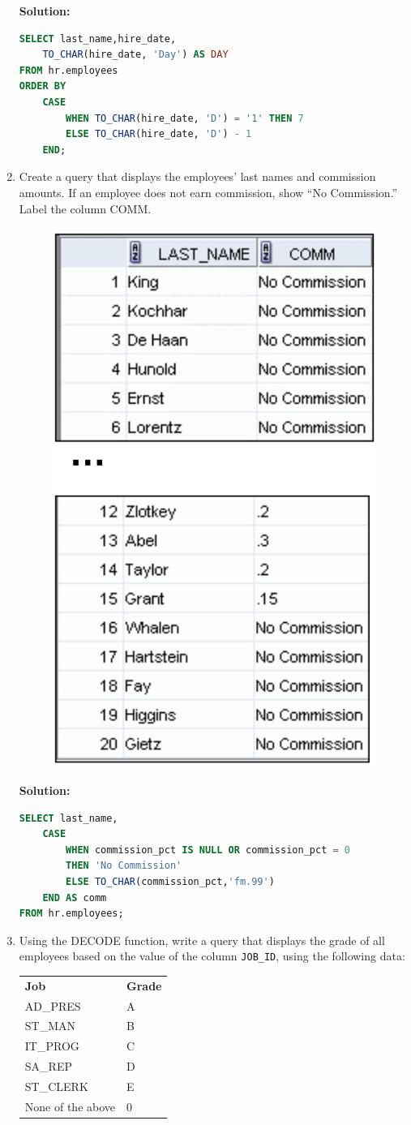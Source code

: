 \documentclass[a4paper,12pt]{article}
\begin{document}
\begin{enumerate}
    \textbf{Solution: }
    \begin{lstlisting}[language=SQL]
SELECT last_name,hire_date,
    TO_CHAR(hire_date, 'Day') AS DAY
FROM hr.employees
ORDER BY
    CASE
        WHEN TO_CHAR(hire_date, 'D') = '1' THEN 7
        ELSE TO_CHAR(hire_date, 'D') - 1
    END;
    \end{lstlisting}
        \item Create a query that displays the employees' last names and commission amounts. If an employee
does not earn commission, show “No Commission.” Label the column COMM.
    \begin{figure}[h]
        \centering
            \centering
            \includegraphics[width=.35\linewidth]{graphics/44.png}
    \end{figure}
    \newpage
    \textbf{Solution: }
    \begin{lstlisting}[language=SQL]
SELECT last_name,
    CASE 
        WHEN commission_pct IS NULL OR commission_pct = 0 
        THEN 'No Commission'
        ELSE TO_CHAR(commission_pct,'fm.99')
    END AS comm
FROM hr.employees;
    \end{lstlisting}
        \item Using the DECODE function, write a query that displays the grade of all employees based on the
value of the column \texttt{JOB\_ID}, using the following data:
 
\begin{tabularx}{\textwidth}{lX}
\textbf{Job} & \textbf{Grade} \\
AD\_PRES & A \\
ST\_MAN & B \\
IT\_PROG & C \\
SA\_REP & D \\
ST\_CLERK & E \\
None of the above & 0 \\
\end{tabularx}
    

\end{enumerate}
\end{document}
